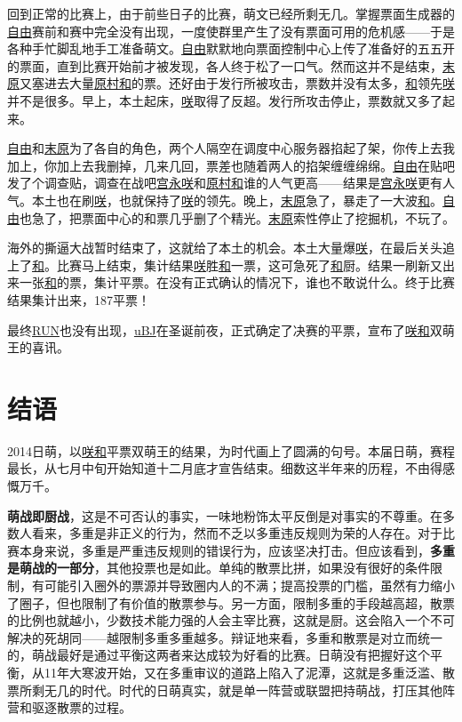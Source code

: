 回到正常的比赛上，由于前些日子的比赛，萌文已经所剩无几。掌握票面生成器的\uline{自由}赛前和赛中完全没有出现，一度使群里产生了没有票面可用的危机感——于是各种手忙脚乱地手工准备萌文。\uline{自由}默默地向票面控制中心上传了准备好的五五开的票面，直到比赛开始前才被发现，各人终于松了一口气。然而这并不是结束，\uline{末原}又塞进去大量\uline{原村和}的票。还好由于发行所被攻击，票数并没有太多，\uline{和}领先\uline{咲}并不是很多。早上，本土起床，\uline{咲}取得了反超。发行所攻击停止，票数就又多了起来。

\uline{自由}和\uline{末原}为了各自的角色，两个人隔空在调度中心服务器掐起了架，你传上去我加上，你加上去我删掉，几来几回，票差也随着两人的掐架缠缠绵绵。\uline{自由}在贴吧发了个调查贴，调查在战吧\uline{宫永咲}和\uline{原村和}谁的人气更高——结果是\uline{宫永咲}更有人气。本土也在刷\uline{咲}，也就保持了\uline{咲}的领先。晚上，\uline{末原}急了，暴走了一大波\uline{和}。\uline{自由}也急了，把票面中心的和票几乎删了个精光。\uline{末原}索性停止了挖掘机，不玩了。

海外的撕逼大战暂时结束了，这就给了本土的机会。本土大量爆\uline{咲}，在最后关头追上了\uline{和}。比赛马上结束，集计结果\uline{咲}胜\uline{和}一票，这可急死了\uline{和}厨。结果一刷新又出来一张\uline{和}的票，集计平票。在没有正式确认的情况下，谁也不敢说什么。终于比赛结果集计出来，187平票！

最终\uline{RUN}也没有出现，\uline{uBJ}在圣诞前夜，正式确定了决赛的平票，宣布了\uline{咲}\uline{和}双萌王的喜讯。

\chapter{结语}

2014日萌，以\uline{咲}\uline{和}平票双萌王的结果，为时代画上了圆满的句号。本届日萌，赛程最长，从七月中旬开始知道十二月底才宣告结束。细数这半年来的历程，不由得感慨万千。

\textbf{萌战即厨战}，这是不可否认的事实，一味地粉饰太平反倒是对事实的不尊重。在多数人看来，多重是非正义的行为，然而不乏以多重违反规则为荣的人存在。对于比赛本身来说，多重是严重违反规则的错误行为，应该坚决打击。但应该看到，\textbf{多重是萌战的一部分}，其他投票也是如此。单纯的散票比拼，如果没有很好的条件限制，有可能引入圈外的票源并导致圈内人的不满；提高投票的门槛，虽然有力缩小了圈子，但也限制了有价值的散票参与。另一方面，限制多重的手段越高超，散票的比例也就越小，少数技术能力强的人会主宰比赛，这就是厨。这会陷入一个不可解决的死胡同——越限制多重多重越多。辩证地来看，多重和散票是对立而统一的，萌战最好是通过平衡这两者来达成较为好看的比赛。日萌没有把握好这个平衡，从11年大寒波开始，又在多重审议的道路上陷入了泥潭，这就是多重泛滥、散票所剩无几的时代。时代的日萌真实，就是单一阵营或联盟把持萌战，打压其他阵营和驱逐散票的过程。
\\

